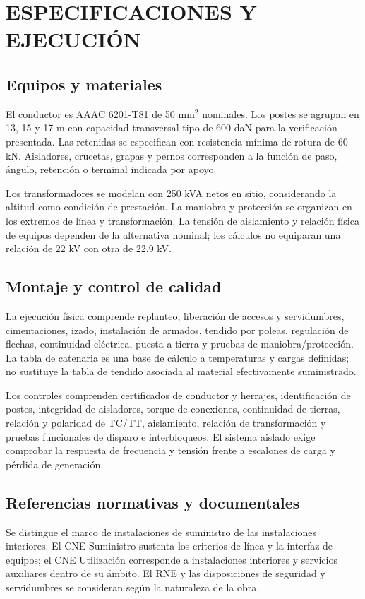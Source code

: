 \chapter{ESPECIFICACIONES Y EJECUCIÓN}
\section{Equipos y materiales}
El conductor es AAAC 6201-T81 de 50 mm$^2$ nominales. Los postes se agrupan en 13, 15 y 17 m con capacidad transversal tipo de 600 daN para la verificación presentada. Las retenidas se especifican con resistencia mínima de rotura de 60 kN. Aisladores, crucetas, grapas y pernos corresponden a la función de paso, ángulo, retención o terminal indicada por apoyo.

Los transformadores se modelan con 250 kVA netos en sitio, considerando la altitud como condición de prestación. La maniobra y protección se organizan en los extremos de línea y transformación. La tensión de aislamiento y relación física de equipos dependen de la alternativa nominal; los cálculos no equiparan una relación de 22 kV con otra de 22.9 kV.
\section{Montaje y control de calidad}
La ejecución física comprende replanteo, liberación de accesos y servidumbres, cimentaciones, izado, instalación de armados, tendido por poleas, regulación de flechas, continuidad eléctrica, puesta a tierra y pruebas de maniobra/protección. La tabla de catenaria es una base de cálculo a temperaturas y cargas definidas; no sustituye la tabla de tendido asociada al material efectivamente suministrado.

Los controles comprenden certificados de conductor y herrajes, identificación de postes, integridad de aisladores, torque de conexiones, continuidad de tierras, relación y polaridad de TC/TT, aislamiento, relación de transformación y pruebas funcionales de disparo e interbloqueos. El sistema aislado exige comprobar la respuesta de frecuencia y tensión frente a escalones de carga y pérdida de generación.
\section{Referencias normativas y documentales}
Se distingue el marco de instalaciones de suministro de las instalaciones interiores. El CNE Suministro sustenta los criterios de línea y la interfaz de equipos; el CNE Utilización corresponde a instalaciones interiores y servicios auxiliares dentro de su ámbito. El RNE y las disposiciones de seguridad y servidumbres se consideran según la naturaleza de la obra.

